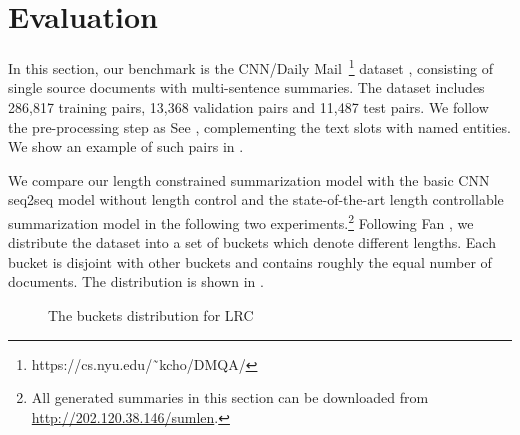 \section{Evaluation}
\label{sec:eval}

In this section, our benchmark is the CNN/Daily
Mail~\footnote{https://cs.nyu.edu/˜kcho/DMQA/}
dataset \cite{HermannKGEKSB15,NallapatiZSGX16,SeeLM17},
consisting of single source documents with multi-sentence summaries.
The dataset includes 286,817 training pairs,
13,368 validation pairs and 11,487 test pairs.
We follow the pre-processing step as See 
 ,
complementing the text slots with named entities.
We show an example of such pairs in .

We compare our length constrained summarization model with
the basic CNN seq2seq model without length control and the state-of-the-art
length controllable summarization model \cite{abs-1711-05217}
in the following two experiments.\footnote{All generated summaries in this section
can be downloaded from \url{http://202.120.38.146/sumlen}.} Following Fan ,
we distribute the dataset into a set of buckets which denote different lengths.
Each bucket is disjoint with other buckets and contains roughly
the equal number of documents.
The distribution is shown in .

\begin{figure}[th!]
\centering
{}
\caption{The buckets distribution for LRC} \label{fig:buckets}
\end{figure}

